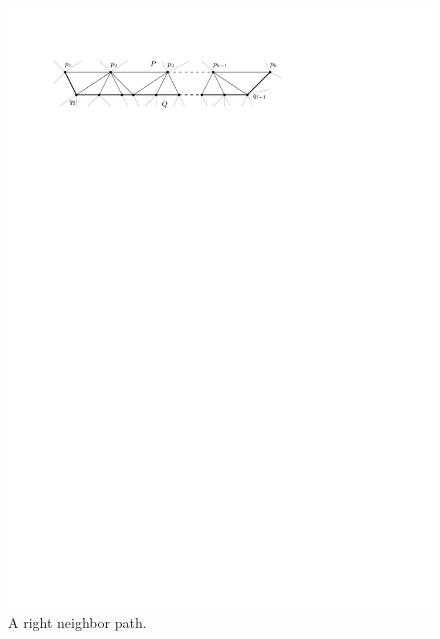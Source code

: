     \begin{figure}[h]
      \centering
      \includegraphics[scale=1]{unifiedAlgo/img/rightNeighbourwalk/neighborPath.pdf}
      \caption{A right neighbor path.}
      \label{fig:right:neighborPath}
    \end{figure}

